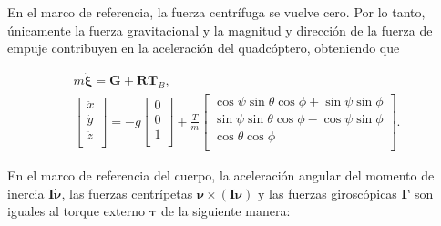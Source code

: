 \documentclass[11pt]{exam}
\begin{document}
        En el marco de referencia, la fuerza centrífuga se vuelve cero. Por lo tanto, \'unicamente la fuerza gravitacional y la magnitud y direcci\'on de la fuerza de empuje contribuyen en la aceleraci\'on del quadc\'optero, obteniendo que

        \begin{equation}
            \begin{gathered}
                m\boldsymbol{\ddot{\xi}} = \boldsymbol{G} + \boldsymbol{RT}_B, \\
                \left[{
                    \begin{array}{c}
                        \ddot{x} \\
                        \ddot{y} \\
                        \ddot{z} \\
                    \end{array} 
                }\right] = -g
                \left[{
                    \begin{array}{c}
                        0 \\
                        0 \\
                        1 \\
                    \end{array} 
                }\right] + \frac{T}{m}
                \left[{
                    \begin{array}{c}
                        \cos{\psi}\sin{\theta}\cos{\phi} + \sin{\psi}\sin{\phi} \\
                        \sin{\psi}\sin{\theta}\cos{\phi} - \cos{\psi}\sin{\phi} \\
                        \cos{\theta}\cos{\phi} \\
                    \end{array} 
                }\right].
            \end{gathered}
        \end{equation}

        En el marco de referencia del cuerpo, la aceleración angular del momento de inercia $\boldsymbol{I\dot{\nu}}$, las fuerzas centrípetas $\boldsymbol{\nu}\times(\boldsymbol{I\nu})$ y las fuerzas giroscópicas $\boldsymbol{\Gamma}$ son iguales al torque externo $\boldsymbol{\tau}$ de la siguiente manera:
\end{document}
